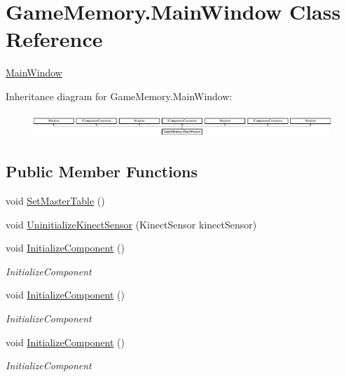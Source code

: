 \hypertarget{class_game_memory_1_1_main_window}{\section{Game\-Memory.\-Main\-Window Class Reference}
\label{class_game_memory_1_1_main_window}
}


\hyperlink{class_game_memory_1_1_main_window}{Main\-Window}  


Inheritance diagram for Game\-Memory.\-Main\-Window\-:\begin{figure}[H]
\begin{center}
\leavevmode
\includegraphics[height=0.919540cm]{class_game_memory_1_1_main_window}
\end{center}
\end{figure}
\subsection*{Public Member Functions}
\begin{DoxyCompactItemize}
\item 
void \hyperlink{class_game_memory_1_1_main_window_a830cbea78d6414fae17ccdb29f390824}{Set\-Master\-Table} ()
\item 
void \hyperlink{class_game_memory_1_1_main_window_abfbe514b8eb23764943a0b19ac00af0a}{Uninitialize\-Kinect\-Sensor} (Kinect\-Sensor kinect\-Sensor)
\item 
void \hyperlink{class_game_memory_1_1_main_window_ae2a1ab5e5ffc2383478ceaec18e83f51}{Initialize\-Component} ()
\begin{DoxyCompactList}\small\item\em Initialize\-Component \end{DoxyCompactList}\item 
void \hyperlink{class_game_memory_1_1_main_window_ae2a1ab5e5ffc2383478ceaec18e83f51}{Initialize\-Component} ()
\begin{DoxyCompactList}\small\item\em Initialize\-Component \end{DoxyCompactList}\item 
void \hyperlink{class_game_memory_1_1_main_window_ae2a1ab5e5ffc2383478ceaec18e83f51}{Initialize\-Component} ()
\begin{DoxyCompactList}\small\item\em Initialize\-Component \end{DoxyCompactList}\end{DoxyCompactItemize}
